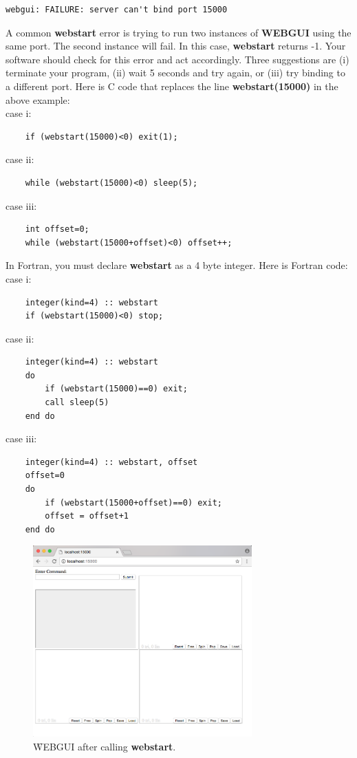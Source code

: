 \begin{verbatim}
webgui: FAILURE: server can't bind port 15000
\end{verbatim}
A common \textbf{webstart} error is trying to run two instances of \textbf{WEBGUI} using the same port. 
The second instance will fail. In this case, \textbf{webstart} returns -1. Your 
software should check for this error and act accordingly. Three suggestions are (i) terminate your program,
(ii) wait 5 seconds and try again, or (iii) try binding to a different port. Here is C code that replaces the line 
\textbf{webstart(15000)} in the above example:\\
case i:
\begin{verbatim}
    if (webstart(15000)<0) exit(1);
\end{verbatim}
case ii:
\begin{verbatim}
    while (webstart(15000)<0) sleep(5);
\end{verbatim}
case iii:
\begin{verbatim}
    int offset=0;
    while (webstart(15000+offset)<0) offset++;
\end{verbatim}
In Fortran, you must declare \textbf{webstart} as a 4 byte integer. Here is Fortran code:\\
case i:
\begin{verbatim}
    integer(kind=4) :: webstart
    if (webstart(15000)<0) stop;
\end{verbatim}
case ii:
\begin{verbatim}
    integer(kind=4) :: webstart
    do
        if (webstart(15000)==0) exit;
        call sleep(5)
    end do
\end{verbatim}
case iii:
\begin{verbatim}
    integer(kind=4) :: webstart, offset
    offset=0
    do
        if (webstart(15000+offset)==0) exit;
        offset = offset+1
    end do
\end{verbatim}

\begin{figure}[p!]
\centering
\includegraphics[width=0.75\textwidth]{pix/gui.png}
\caption{\f{WEBGUI} after calling \textbf{webstart}.}
\label{fig:1}
\end{figure} 

